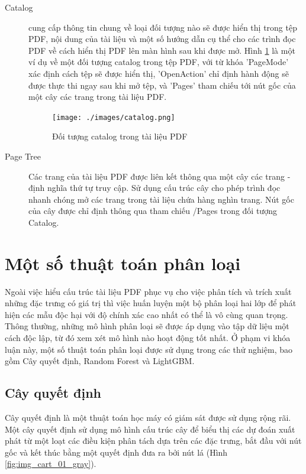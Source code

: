 \documentclass[./../main.tex]{subfiles}
\begin{document}
\begin{description}
	\item[Catalog]  cung cấp thông tin chung về loại đối tượng nào sẽ được hiển thị trong tệp PDF, nội dung của tài liệu và một số hướng dẫn cụ thể cho các trình đọc PDF về cách hiển thị PDF lên màn hình sau khi được mở. Hình \ref{fig:catalog} là một ví dụ về một đối tượng catalog trong tệp PDF, với từ khóa 'PageMode' xác định cách tệp sẽ được hiển thị, 'OpenAction' chỉ định hành động sẽ được thực thi ngay sau khi mở tệp, và 'Pages' tham chiếu tới nút gốc của một cây các trang trong tài liệu PDF.
	      \begin{figure}[ht!]
		      \centering
		      \texttt{[image: ./images/catalog.png]}
		      \caption{Đối tượng catalog trong tài liệu PDF}
		      \label{fig:catalog}
	      \end{figure}

	\item[Page Tree] Các trang của tài liệu PDF được liên kết thông qua một cây các trang - định nghĩa thứ tự truy cập. Sử dụng cấu trúc cây cho phép trình đọc nhanh chóng mở các trang trong tài liệu chứa hàng nghìn trang. Nút gốc của cây được chỉ định thông qua tham chiếu /Pages trong đối tượng Catalog.

\end{description}

\section{Một số thuật toán phân loại}

Ngoài việc hiểu cấu trúc tài liệu PDF phục vụ cho việc phân tích và trích xuất những đặc trưng có giá trị thì việc huấn luyện một bộ phân loại hai lớp để phát hiện các mẫu độc hại với độ chính xác cao nhất có thể là vô cùng quan trọng. Thông thường, những mô hình phân loại sẽ được áp dụng vào tập dữ liệu một cách độc lập, từ đó xem xét mô hình nào hoạt động tốt nhất. Ở phạm vi khóa luận này, một số thuật toán phân loại được sử dụng trong các thử nghiệm, bao gồm Cây quyết định, Random Forest và LightGBM.

\subsection{Cây quyết định}
Cây quyết định là một thuật toán học máy có giám sát được sử dụng rộng rãi. Một cây quyết định sử dụng mô hình cấu trúc cây để biểu thị các dự đoán xuất phát từ một loạt các điều kiện phân tách dựa trên các đặc trưng, bắt đầu với nút gốc và kết thúc bằng một quyết định đưa ra bởi nút lá (Hình \ref{fig:img_cart_01_gray}).
\end{document}
